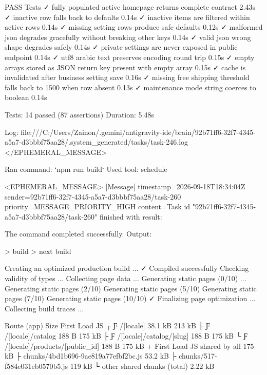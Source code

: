    PASS  Tests\Feature\HomepagePublicTest
  ✓ fully populated active homepage returns complete contract            2.43s  
  ✓ inactive row falls back to defaults                                  0.14s  
  ✓ inactive items are filtered within active rows                       0.14s  
  ✓ missing setting rows produce safe defaults                           0.12s  
  ✓ malformed json degrades gracefully without breaking other keys       0.14s  
  ✓ valid json wrong shape degrades safely                               0.14s  
  ✓ private settings are never exposed in public endpoint                0.14s  
  ✓ utf8 arabic text preserves encoding round trip                        0.15s  
  ✓ empty arrays stored as JSON return key present with empty array      0.15s  
  ✓ cache is invalidated after business setting save                     0.16s  
  ✓ missing free shipping threshold falls back to 1500 when row absent   0.13s  
  ✓ maintenance mode string coerces to boolean                           0.14s  

  Tests:    14 passed (87 assertions)
  Duration: 5.48s

Log: file:///C:/Users/Zainon/.gemini/antigravity-ide/brain/92b71ff6-32f7-4345-a5a7-d3bbbf75aa28/.system_generated/tasks/task-246.log
</EPHEMERAL_MESSAGE>


Ran command: `npm run build`
Used tool: schedule

<EPHEMERAL_MESSAGE>
[Message] timestamp=2026-09-18T18:34:04Z sender=92b71ff6-32f7-4345-a5a7-d3bbbf75aa28/task-260 priority=MESSAGE_PRIORITY_HIGH content=Task id "92b71ff6-32f7-4345-a5a7-d3bbbf75aa28/task-260" finished with result:

				The command completed successfully.
				Output:
				
> build
> next build

   Creating an optimized production build ...
 ✓ Compiled successfully
   Checking validity of types ...
   Collecting page data ...
   Generating static pages (0/10) ...
   Generating static pages (2/10) 
   Generating static pages (5/10) 
   Generating static pages (7/10) 
   Generating static pages (10/10) 
 ✓ Finalizing page optimization ...
   Collecting build traces ...

Route (app)                              Size     First Load JS
┌ Ƒ /[locale]                            38.1 kB         213 kB
├ Ƒ /[locale]/catalog                    188 B           175 kB
├ Ƒ /[locale]/catalog/[slug]             188 B           175 kB
└ Ƒ /[locale]/products/[public_id]       188 B           175 kB
+ First Load JS shared by all            175 kB
  ├ chunks/4bd1b696-9ae819a77efbf2bc.js  53.2 kB
  ├ chunks/517-f584e031eb0570b5.js       119 kB
  └ other shared chunks (total)          2.22 kB

